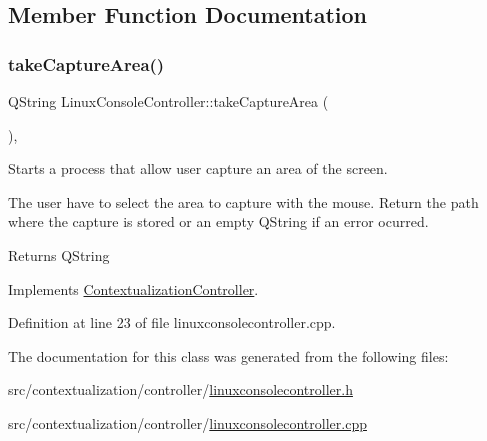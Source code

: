 \subsection{Member Function Documentation}
\mbox{\label{classLinuxConsoleController_ac9944bf1302b077c733802349359e777}} 
\subsubsection{\texorpdfstring{take\+Capture\+Area()}{takeCaptureArea()}}
{\footnotesize\ttfamily Q\+String Linux\+Console\+Controller\+::take\+Capture\+Area (\begin{DoxyParamCaption}{ }\end{DoxyParamCaption})\hspace{0.3cm}{\ttfamily [override]}, {\ttfamily [virtual]}}



Starts a process that allow user capture an area of the screen. 

The user have to select the area to capture with the mouse. Return the path where the capture is stored or an empty Q\+String if an error ocurred. \begin{DoxyReturn}{Returns}
Q\+String 
\end{DoxyReturn}


Implements \mbox{\hyperlink{classContextualizationController_a121919886590cd4955bbcc2d8b747b26}{Contextualization\+Controller}}.



Definition at line 23 of file linuxconsolecontroller.\+cpp.



The documentation for this class was generated from the following files\+:\begin{DoxyCompactItemize}
\item 
src/contextualization/controller/\mbox{\hyperlink{linuxconsolecontroller_8h}{linuxconsolecontroller.\+h}}\item 
src/contextualization/controller/\mbox{\hyperlink{linuxconsolecontroller_8cpp}{linuxconsolecontroller.\+cpp}}\end{DoxyCompactItemize}
